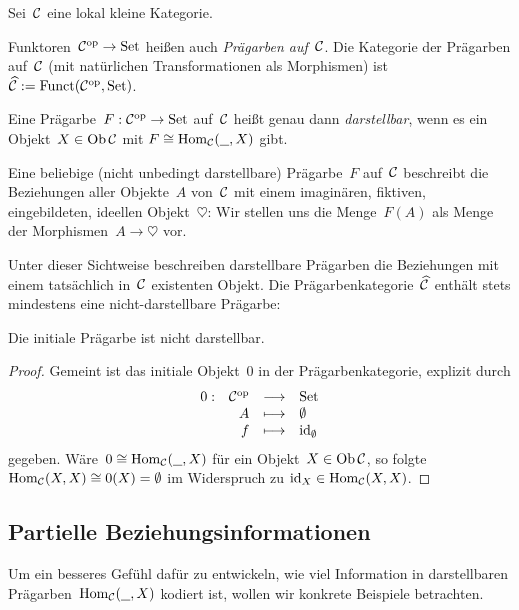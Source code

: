 Sei~$\mathcal{C}$ eine lokal kleine Kategorie.

\begin{defn}Funktoren~$\mathcal{C}^{\mathrm{op}} \to \mathrm{Set}$ heißen auch \emph{Prägarben
auf~$\mathcal{C}$}. Die Kategorie der Prägarben auf~$\mathcal{C}$ (mit natürlichen
Transformationen als Morphismen) ist~$\widehat{\mathcal{C}} := \mathrm{Funct}(\mathcal{C}^{\mathrm{op}},\mathrm{Set})$.
\end{defn}


\begin{defn}Eine Prägarbe~$F:\mathcal{C}^{\mathrm{op}}\to\mathrm{Set}$ auf~$\mathcal{C}$ heißt genau dann
\emph{darstellbar}, wenn es ein Objekt~$X \in \operatorname{Ob}\mathcal{C}$ mit $F \cong
\mathrm{Hom}_{\mathcal{C}}(\underline{\ \ },X)$ gibt.\end{defn}

\begin{motto}\label{praegarbeideell}%
Eine beliebige (nicht unbedingt darstellbare) Prägarbe~$F$
auf~$\mathcal{C}$ beschreibt die Beziehungen aller Objekte~$A$ von~$\mathcal{C}$ mit einem
imaginären, fiktiven, eingebildeten, ideellen Objekt~$\heartsuit$: Wir stellen uns die
Menge~$F(A)$ als Menge der Morphismen~$A \to \heartsuit$ vor.\end{motto}

Unter dieser Sichtweise beschreiben darstellbare Prägarben die Beziehungen mit
einem tatsächlich in~$\mathcal{C}$ existenten Objekt. Die
Prägarbenkategorie~$\widehat{\mathcal{C}}$ enthält stets mindestens eine
nicht-darstellbare Prägarbe:
\begin{prop}Die initiale Prägarbe ist nicht darstellbar.\end{prop}
\begin{proof}Gemeint ist das initiale Objekt~$0$ in der Prägarbenkategorie,
explizit durch
\[ \begin{array}{@{}rrcl@{}}
  0 : & \C^\op &\longrightarrow& \Set \\
  & A &\longmapsto& \emptyset \\
  & f &\longmapsto& \id_\emptyset
\end{array} \]
gegeben. Wäre~$0 \cong \mathrm{Hom}_{\mathcal{C}}(\underline{\ \ },X)$ für ein Objekt~$X\in\operatorname{Ob}\mathcal{C}$,
so folgte~$\mathrm{Hom}_{\mathcal{C}}(X,X) \cong 0(X) = \emptyset$ im Widerspruch zu
$\mathrm{id}_X \in \mathrm{Hom}_{\mathcal{C}}(X,X)$.\end{proof}


\subsection{Partielle Beziehungsinformationen}

Um ein besseres Gefühl dafür zu entwickeln, wie viel Information in
darstellbaren Prägarben~$\mathrm{Hom}_{\mathcal{C}}(\underline{\ \ },X)$ kodiert ist, wollen wir
konkrete Beispiele betrachten.


